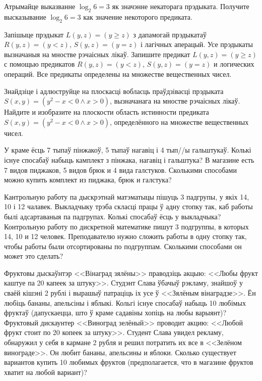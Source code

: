 \begin{problemList}

\problemItemSimple
{Атрымайце выказванне $\log_{2}{6} = 3$ як значэнне некаторага прэдыката.}
{Получите высказывание $\log_{2}{6} = 3$ как значение некоторого предиката.}

\bigskip

\problemItemSimple
{Запішыце прэдыкат $L(y, z) = (y \ge z)$ з дапамогай прэдыкатаў $R(y, z) = (y < z)$, $S(y, z) = (y =z)$ і лагічных аперацый.
Усе прэдыкаты вызначаныя на мностве рэчаісных лікаў.}
{Запишите предикат $L(y, z) = (y \ge z)$ с помощью предикатов $R(y, z) = (y < z)$, $S(y, z) = (y =z)$ и логических операций.
Все предикаты определены на множестве вещественных чисел.}

\bigskip

\problemItemSimple
{Знайдзіце і адлюструйце на плоскасці вобласць праўдзівасці прэдыката $S(x, y) = (y^2-x < 0 \wedge x > 0)$, вызначанага на мностве рэчаісных лікаў.}
{Найдите и изобразите на плоскости область истинности предиката $S(x, y) = (y^2-x < 0 \wedge x > 0)$, определённого на множестве вещественных чисел.}

\bigskip

\problemItemSimple
{У краме ёсць 7 тыпаў пінжакоў, 5 тыпаў нагавіц і 4 тып//ы гальштукаў.
Колькі існуе спосабаў набыць камплект з пінжака, нагавіц і гальштука?}
{В магазине есть 7 видов пиджаков, 5 видов брюк и 4 вида галстуков.
Сколькими способами можно купить комплект из пиджака, брюк и галстука?}

\bigskip

\problemItemSimple
{Кантрольную работу па дыскрэтнай матэматыцы пішуць 3 падгрупы, у якіх 14, 10 і 12 чалавек.
Выкладчыку трэба скласці працы ў адну стопку так, каб работы былі адсартаваныя па падгрупах.
Колькі спосабаў ёсць у выкладчыка?}
{Контрольную работу по дискретной математике пишут 3 подгруппы, в которых 14, 10 и 12 человек.
Преподавателю нужно сложить работы в одну стопку так, чтобы работы были отсортированы по подгруппам.
Сколькими способами он может это сделать?}

\bigskip

\problemItemSimple
{Фруктовы дыскаўнтэр <<Вінаград зялёны>> праводзіць акцыю: <<Любы фрукт каштуе па 20 капеек за штуку>>.
Студэнт Слава ўбачыў рэкламу, знайшоў у сваёй кішэні 2 рублі і вырашыў патраціць іх усе ў <<Зялёным вінаградзе>>.
Ён любіць бананы, апельсіны і яблыкі. Кольгі існуе спосабаў набыць 10 любімых фруктаў
(дапускаецца, што ў краме садавіны хопіць на любы варыянт)?}
{Фруктовый дискаунтер <<Виноград зелёный>> проводит акцию: <<Любой фрукт стоит по 20 копеек за штуку>>.
Студент Слава увидел рекламу, обнаружил у себя в кармане 2 рубля и решил потратить их все в <<Зелёном винограде>>.
Он любит бананы, апельсины и яблоки. Сколько существует вариантов купить 10 любимых фруктов
(предполагается, что в магазине фруктов хватит на любой вариант)?}


\end{problemList}
